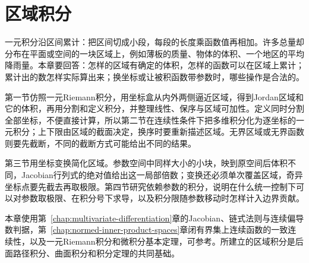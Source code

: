 \chapter{区域积分}
\label{chap:region-integrals}
\label{chap:multivariate-integration}

一元积分沿区间累计：把区间切成小段，每段的长度乘函数值再相加。许多总量却分布在平面或空间的一块区域上，例如薄板的质量、物体的体积、一个地区的平均降雨量。本章要回答：怎样的区域有确定的体积，怎样的函数可以在区域上累计；累计出的数怎样实际算出来；换坐标或让被积函数带参数时，哪些操作是合法的。

第一节仿照一元Riemann积分，用坐标盒从内外两侧逼近区域，得到Jordan区域和它的体积，再用分割和定义积分，并整理线性、保序与区域可加性。定义同时分割全部坐标，不便直接计算，所以第二节在连续性条件下把多维积分化为逐坐标的一元积分；上下限由区域的截面决定，换序时要重新描述区域。无界区域或无界函数则要先截断，不同的截断方式可能给出不同的结果。

第三节用坐标变换简化区域。参数空间中同样大小的小块，映到原空间后体积不同，Jacobian行列式的绝对值给出这一局部倍数；变换还必须单次覆盖区域，奇异坐标点要先截去再取极限。第四节研究依赖参数的积分，说明在什么统一控制下可以对参数取极限、在积分号下求导，以及积分限随参数移动时怎样计入边界贡献。

本章使用第~\ref{chap:multivariate-differentiation}章的Jacobian、链式法则与连续偏导数判据，第~\ref{chap:normed-inner-product-spaces}章闭有界集上连续函数的一致连续性，以及一元Riemann积分和微积分基本定理，可参考。所建立的区域积分是后面路径积分、曲面积分和积分定理的共同基础。



